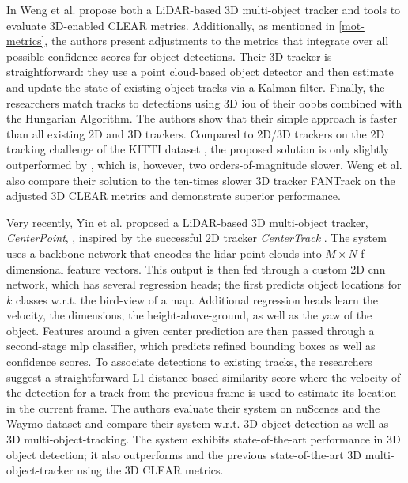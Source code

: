 \documentclass[headsepline, hidelinks, footsepline, footinclude=false, oneside, fontsize=11pt, paper=a4, listof=totoc, bibliography=totoc]{scrbook}
\begin{document}
In \cite{wengBaseline3DMultiObject2019} Weng et al. propose both a LiDAR-based 3D multi-object tracker and tools to evaluate 3D-enabled CLEAR metrics. Additionally, as mentioned in \cref{mot-metrics}, 
the authors present adjustments to the metrics that integrate over all possible confidence scores for object detections.
Their 3D tracker is straightforward: they use a point cloud-based object detector \cite{shiPointRCNN3DObject2019a} and then estimate and update the state of existing object tracks via a Kalman filter. Finally, the researchers match tracks to detections using 3D \gls{iou} of their \glspl{oobb} combined with the Hungarian Algorithm. The authors show that their simple approach is faster than all existing 2D and 3D trackers.
Compared to 2D/3D trackers on the 2D tracking challenge of the KITTI dataset \cite{geigerVisionMeetsRobotics2013}, the proposed solution is only slightly outperformed by \cite{sharmaPixelsLeveragingGeometry2018}, which is, however, two orders-of-magnitude slower. 
Weng et al. also compare their solution to the ten-times slower 3D tracker FANTrack \cite{baserFANTrack3DMultiObject2019} on the adjusted 3D CLEAR metrics and demonstrate superior performance.

Very recently, Yin et al. proposed a LiDAR-based 3D multi-object tracker, \emph{CenterPoint}, \cite{yinCenterbased3DObject2021}, inspired by the successful 2D tracker \emph{CenterTrack} \cite{zhouObjectsPoints2019}. 
The system uses a backbone network that encodes the \gls{lidar} point clouds into \(M \times N\) f-dimensional feature vectors. This output is then fed through a custom 2D \gls{cnn} network, which has several regression heads; 
the first predicts object locations for \(k\) classes w.r.t. the bird-view of a map. Additional regression heads learn the velocity, the dimensions, the height-above-ground, as well as the yaw of the object.
Features around a given center prediction are then passed through a second-stage \gls{mlp} classifier, which predicts refined bounding boxes as well as confidence scores. To associate detections to existing tracks, the researchers
suggest a straightforward L1-distance-based similarity score where the velocity of the detection for a track from the previous frame is used to estimate its location in the current frame.
The authors evaluate their system on nuScenes \cite{caesarNuScenesMultimodalDataset2020} and the Waymo dataset \cite{sunScalabilityPerceptionAutonomous2020} and compare their system w.r.t. 3D object detection as well as 3D multi-object-tracking.
The system exhibits state-of-the-art performance in 3D object detection; it also outperforms \cite{wengBaseline3DMultiObject2019} and the previous state-of-the-art 3D multi-object-tracker \cite{chiuProbabilistic3DMultiObject2020} using the 3D CLEAR metrics.
\end{document}
